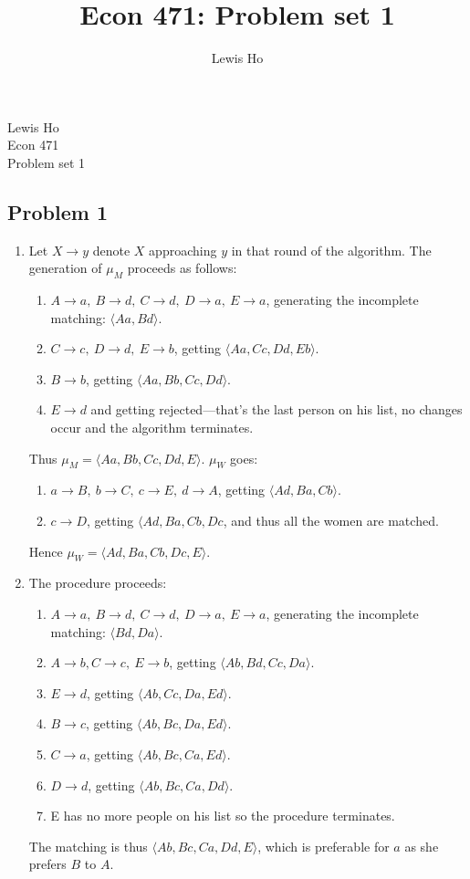 \documentclass[11pt]{article}
\title{Econ 471: Problem set 1}
\author{Lewis Ho}
\begin{document}
\begin{flushleft}
  Lewis Ho\\
  Econ 471\\
  Problem set 1
\end{flushleft}
\subsection*{Problem 1}
\begin{enumerate}[label=(\alph*)]
\item Let $X\to y$ denote $X$ approaching $y$ in that round of the algorithm.
  The generation of $\mu_M$ proceeds as follows:
  \begin{enumerate}[label=(\roman*)]
  \item $A\to a,\ B\to d,\ C\to d,\ D\to a,\ E\to a$, generating the incomplete
    matching: $\langle Aa, Bd\rangle$.
  \item $C\to c,\ D\to d,\ E\to b$, getting $\langle Aa, Cc, Dd, Eb\rangle$.
  \item $B\to b$, getting $\langle Aa, Bb, Cc, Dd\rangle$.
  \item $E\to d$ and getting rejected---that's the last person on his list, no
    changes occur and the algorithm terminates.
  \end{enumerate}
  Thus $\mu_M = \langle Aa, Bb, Cc, Dd, E\rangle$.
  $\mu_W$ goes:
  \begin{enumerate}[label=(\roman*)]
  \item $a\to B,\ b\to C,\ c\to E,\ d\to A$, getting $\langle Ad,Ba,Cb\rangle$.
  \item $c\to D$, getting $\langle Ad, Ba, Cb, Dc$, and thus all the women are
    matched.
  \end{enumerate}
  Hence $\mu_W = \langle Ad, Ba, Cb, Dc, E\rangle$.
\item The procedure proceeds:
  \begin{enumerate}[label=(\roman*)]
  \item $A\to a,\ B\to d,\ C\to d,\ D\to a,\ E\to a$, generating the incomplete
    matching: $\langle Bd, Da\rangle$.
  \item $A\to b, C\to c,\ E\to b$, getting $\langle Ab, Bd, Cc, Da\rangle$.
  \item $E\to d$, getting $\langle Ab, Cc, Da, Ed\rangle$.
  \item $B\to c$, getting $\langle Ab, Bc, Da, Ed\rangle$.
  \item $C\to a$, getting $\langle Ab, Bc, Ca, Ed\rangle$.
  \item $D\to d$, getting $\langle Ab, Bc, Ca, Dd\rangle$.
  \item E has no more people on his list so the procedure terminates.
  \end{enumerate}
  The matching is thus $\langle Ab, Bc, Ca, Dd, E\rangle$, which is preferable
  for $a$ as she prefers $B$ to $A$.
\end{enumerate}
\end{document}
